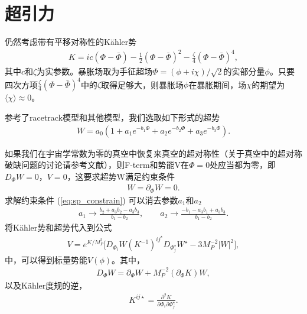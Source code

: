 \section{超引力}

仍然考虑带有平移对称性的K\"ahler势\citep{ketov2016susy}
\begin{align}
    K=ic(\Phi-\bar\Phi)-\frac{1}{2}{(\Phi-\bar\Phi)}^2-\frac{\zeta}{4}{(\Phi-\bar\Phi)}^4,
\end{align}
其中$c$和$\zeta$为实参数。暴胀场取为手征超场$\Phi=(\phi+i\chi)/\sqrt{2}$的实部分量$\phi$。只要四次方项$\frac{\zeta}{4}{(\Phi-\bar\Phi)}^4$中的$\zeta$取得足够大，则暴胀场$\phi$在暴胀期间，场$\chi$的期望为$\langle\chi\rangle\approx0$。

参考了racetrack模型\citep{krasnikov1987supersymmetry,escoda2003saltatory,blanco2005racetrack}和其他模型\citep{ketov2016susy}，我们选取如下形式的超势
\begin{align}
    W=a_0(1+a_1e^{-b_1\Phi}+a_2e^{-b_2\Phi}+a_3e^{-b_3\Phi}).
\end{align}

如果我们在宇宙学常数为零的真空中恢复来真空的超对称性（关于真空中的超对称破缺问题的讨论请参考文献\citep{gao2015inflection}），则F-term和势能V在$\Phi=0$处应当都为零，即$D_{\Phi}W=0$，$V=0$，这要求超势W满足约束条件
\begin{align}\label{eq:sp_constrain}
    W=\partial_{\Phi}W=0.
\end{align}
求解约束条件 (\ref{eq:sp_constrain}) 可以消去参数$a_1$和$a_2$
\begin{align}
    a_1\rightarrow \frac{b_2+a_3b_2-a_3b_3}{b_1-b_2},\qquad 
    a_2\rightarrow \frac{-b_1-a_3b_1+a_3b_3}{b_1-b_2}.
\end{align}
将K\"ahler势和超势代入到公式
\begin{align}
    V=e^{K/M^2_P}\lbrack
    D_{\Phi_i}W{(K^{-1})}^{ij^{\star}}D_{\Phi^{\star}_j}W^{\star}-3M^{-2}_P|W|^2\rbrack,
\end{align}
中，可以得到标量势能$V(\phi)$。其中，
\begin{align}
    D_{\Phi}W=\partial_{\Phi}W+M^{-2}_P{(\partial_{\Phi}K)}W,
\end{align}
以及K\"ahler度规的逆，
\begin{align}
    K^{ij\star} = \frac{\partial^2K}{\partial\Phi_i\partial\Phi^{\star}_j}.
\end{align}

